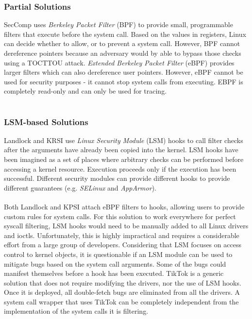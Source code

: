 \subsubsection{Partial Solutions}
SecComp\cite{seccomp} uses \emph{Berkeley Packet Filter} (BPF) to provide small,
programmable filters that execute before the system call. Based on the values
in registers, Linux can decide whether to allow, or to prevent a system call.
However, BPF cannot dereference pointers because an adversary would by able to
bypass those checks using a TOCTTOU attack. \emph{Extended Berkeley Packet
Filter} (eBPF)\cite{ebpf} provides larger filters which can also dereference
user pointers. However, eBPF cannot be used for security purposes - it cannot
stop system calls from executing. EBPF is completely read-only and can only be
used for tracing.
\\
\\
\subsubsection{LSM-based Solutions}
Landlock\cite{landlock} and KRSI\cite{krsi} use \emph{Linux Security Module}
\cite{morris2002linux} (LSM) hooks to call filter checks after the arguments
have already been copied into the kernel. LSM hooks have been imagined as a set
of places where arbitrary checks can be performed before accessing a kernel
resource. Execution proceeds only if the execution has been successful.
Different security modules can provide different hooks to provide different
guarantees (e.g. \emph{SELinux}\cite{smalley2001implementing} and
\emph{AppArmor}\cite{gruenbacher2007apparmor}).
\\
\\
Both Landlock and KPSI attach eBPF filters to hooks, allowing users to provide
custom rules for system calls. For this solution to work everywhere for perfect
syscall filtering, LSM hooks would need to be manually added to all Linux
drivers and ioctls. Unfortunately, this is highly impractical and requires a
considerable effort from a large group of developers. Considering that LSM
focuses on access control to kernel objects, it is questionable if an LSM module
can be used to mitigate bugs based on the system call arguments. Some of the
bugs could manifest themselves before a hook has been executed. TikTok is a
generic solution that does not require modifying the drivers, nor the use of
LSM hooks. Once it is deployed, all double-fetch bugs are eliminated from all
the drivers. A system call wrapper that uses TikTok can be completely
independent from the implementation of the system calls it is filtering.


